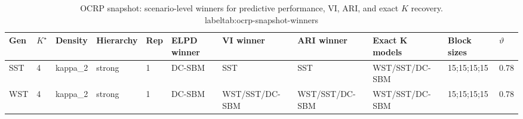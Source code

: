 \begin{table}[!h]
\centering
\caption{OCRP snapshot: scenario-level winners for predictive performance, VI, ARI, and exact $K$ recovery.\\label{tab:ocrp-snapshot-winners}}
\centering
\begin{tabular}[t]{lllllllllll}
\toprule
Gen & $K^\star$ & Density & Hierarchy & Rep & ELPD winner & VI winner & ARI winner & Exact K models & Block sizes & $\vartheta$\\
\midrule
SST & 4 & kappa_2 & strong & 1 & DC-SBM & SST & SST & WST/SST/DC-SBM & 15;15;15;15 & 0.78\\
WST & 4 & kappa_2 & strong & 1 & DC-SBM & WST/SST/DC-SBM & WST/SST/DC-SBM & WST/SST/DC-SBM & 15;15;15;15 & 0.78\\
\bottomrule
\end{tabular}
\end{table}
